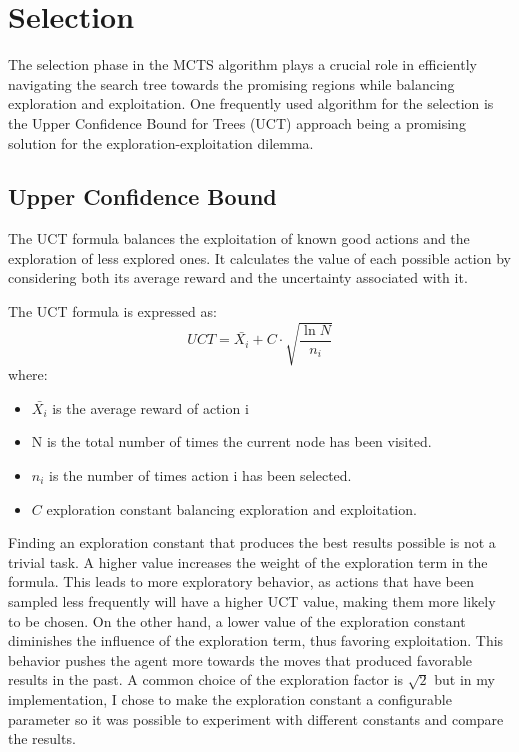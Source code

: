 \section{Selection} \label{sec:MCTS_Selection}

The selection phase in the MCTS algorithm plays a crucial role in efficiently navigating the search tree towards the promising regions while balancing exploration and exploitation. 
One frequently used algorithm for the selection is the Upper Confidence Bound for Trees (UCT) approach being a promising solution for the exploration-exploitation dilemma.

\subsection{Upper Confidence Bound} \label{subsec:MCTS_Selection_UCT}

The UCT formula balances the exploitation of known good actions and the exploration of less explored ones. It calculates the value of each possible action by considering 
both its average reward and the uncertainty associated with it. 

The UCT formula is expressed as:
\[UCT = \bar{X_i} + C \cdot \sqrt{\frac{\ln{N}}{n_i}}\]
where:
\begin{itemize}
    \item $\bar{X_i}$ is the average reward of action i
    \item N is the total number of times the current node has been visited.
    \item ${n_i}$ is the number of times action i has been selected.
    \item $C$ exploration constant balancing exploration and exploitation.
\end{itemize}

Finding an exploration constant that produces the best results possible is not a trivial task. A higher value increases the weight of the exploration term in the formula. 
This leads to more exploratory behavior, as actions that have been sampled less frequently will have a higher UCT value, making them more likely to be chosen.
On the other hand, a lower value of the exploration constant diminishes the influence of the exploration term, thus favoring exploitation. This behavior pushes the 
agent more towards the moves that produced favorable results in the past. A common choice of the exploration factor is $\sqrt{2} $ but in my implementation, I chose
to make the exploration constant a configurable parameter so it was possible to experiment with different constants and compare the results.

